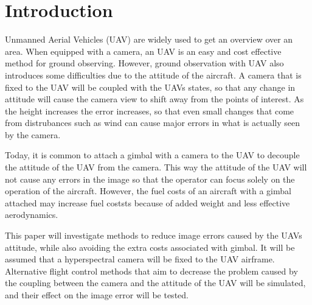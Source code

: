 \section{Introduction}

Unmanned Aerial Vehicles (UAV) are widely used to get an overview over an area. When equipped with a camera, an UAV is an easy and cost effective method for ground observing. However, ground observation with UAV also introduces some difficulties due to the attitude of the aircraft. A camera that is fixed to the UAV will be coupled with the UAVs states, so that any change in attitude will cause the camera view to shift away from the points of interest. As the height increases the error increases, so that even small changes that come from distrubances such as wind can cause major errors in what is actually seen by the camera.

Today, it is common to attach a gimbal with a camera to the UAV to decouple the attitude of the UAV from the camera. This way the attitude of the UAV will not cause any errors in the image so that the operator can focus solely on the operation of the aircraft. However, the fuel costs of an aircraft with a gimbal attached may increase fuel coststs because of added weight and less effective aerodynamics.

This paper will investigate methods to reduce image errors caused by the UAVs attitude, while also avoiding the extra costs associated with gimbal. It will be assumed that a hyperspectral camera will be fixed to the UAV airframe. Alternative flight control methods that aim to decrease the problem caused by the coupling between the camera and the attitude of the UAV will be simulated, and their effect on the image error will be tested.